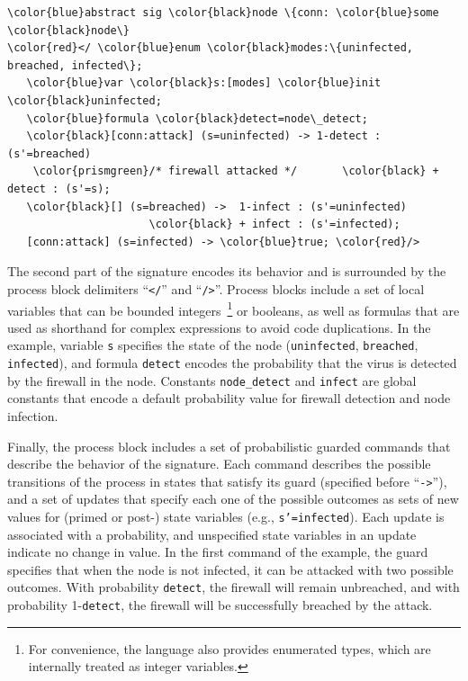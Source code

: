 \documentclass[10pt,journal,compsoc]{IEEEtran}
\begin{document}

{\scriptsize
\begin{Verbatim}[commandchars=\\\{\},codes={\catcode`$=3\catcode`^=7\catcode`_=8}]
\color{blue}abstract sig \color{black}node \{conn: \color{blue}some \color{black}node\}
\color{red}</ \color{blue}enum \color{black}modes:\{uninfected, breached, infected\};
   \color{blue}var \color{black}s:[modes] \color{blue}init \color{black}uninfected;
   \color{blue}formula \color{black}detect=node\_detect;
   \color{black}[conn:attack] (s=uninfected) -> 1-detect : (s'=breached)
    \color{prismgreen}/* firewall attacked */       \color{black} + detect : (s'=s);
   \color{black}[] (s=breached) ->  1-infect : (s'=uninfected)
                      \color{black} + infect : (s'=infected);
   [conn:attack] (s=infected) -> \color{blue}true; \color{red}/>
\end{Verbatim}
}

The second part of the signature encodes its behavior and is surrounded by the process block delimiters ``{\tt</}'' and ``{\tt />}''. 
Process blocks include a set of local variables that can be bounded integers~\footnote{For convenience, the language also provides enumerated types, which are internally treated as integer variables.} or booleans, as well as formulas that are used as shorthand for complex expressions to avoid code duplications. 
In the example, variable {\tt s} specifies the state of the node ({\tt uninfected}, {\tt breached}, {\tt infected}), and formula {\tt detect} encodes the probability that the virus is detected by the firewall in the node. 
Constants {\tt node\_detect} and {\tt infect} are global constants that encode a default probability value for firewall detection and node infection. %

Finally, the process block includes a set of probabilistic guarded commands that describe the behavior of the signature. 
Each command describes the possible transitions of the process in states that satisfy its guard (specified before {``{\tt->}''}), and a set of updates that specify each one of the possible outcomes as sets of new values for (primed or post-) state variables (e.g., {\tt s'=infected}). 
Each update is associated with a probability, and unspecified state variables in an update indicate no change in value. 
In the first command of the example, the guard specifies that when the node is not infected, it can be attacked with two possible outcomes. With probability {\tt detect}, the firewall will remain unbreached, and with probability 1-{\tt detect}, the firewall will be successfully breached by the attack. 
\end{document}
